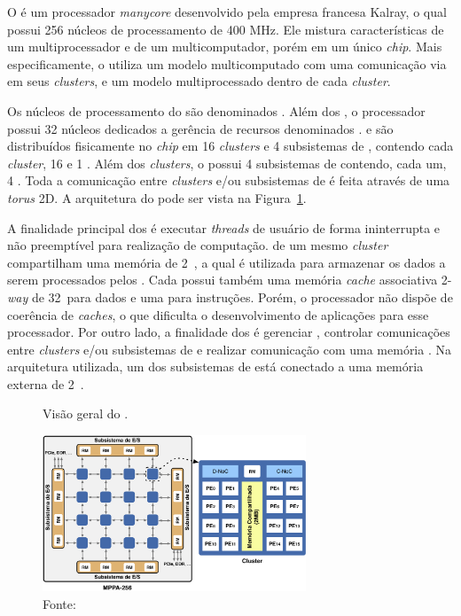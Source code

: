 O \mppa é um processador \textit{manycore} desenvolvido pela empresa francesa
Kalray, o qual possui 256 núcleos de processamento de 400 MHz. Ele mistura características
de um multiprocessador e de um multicomputador, porém em um único \textit{chip}.
Mais especificamente, o \mppa utiliza um modelo multicomputado com uma
comunicação via \noc em seus \textit{clusters}, e um modelo multiprocessado
dentro de cada \textit{cluster}.

Os núcleos de processamento do \mppa são denominados \pes.
Além dos \pes, o processador possui 32 núcleos dedicados a gerência de recursos
denominados  \rmans. \pes e \rmans são distribuídos
fisicamente no \textit{chip} em 16 \textit{clusters} e 4 subsistemas de \es,
contendo cada \textit{cluster}, 16 \pes e 1 \rman. Além dos \textit{clusters}, o
\mppa possui 4 subsistemas de \es contendo, cada um, 4 \rmans. Toda a comunicação
entre \textit{clusters} e/ou subsistemas de \es é feita através de uma \noc
\textit{torus} 2D. A arquitetura do \mppa pode ser vista na Figura~\ref{fig:mppa}.

A finalidade principal dos \pes é executar \textit{threads} de usuário de forma
ininterrupta e não preemptível para realização de computação. \pes de um mesmo
\textit{cluster} compartilham uma memória de 2~\mb, a qual é utilizada para
armazenar os dados a serem processados pelos \pes. Cada \pe possui também uma
memória \textit{cache} associativa 2-\textit{way} de 32~\kb para dados e uma para
instruções. Porém, o processador não dispõe de coerência de \textit{caches}, o
que dificulta o desenvolvimento de aplicações para esse processador. Por outro
lado, a finalidade dos \rmans é gerenciar \es, controlar comunicações entre
\textit{clusters} e/ou subsistemas de \es e realizar comunicação com uma memória
\ram. Na arquitetura utilizada, um dos subsistemas de \es está conectado a uma
memória externa \lpddr de 2~\gb.

\begin{figure}
	\centering
	\caption{Visão geral do \mppa.}
	\includegraphics[width=0.7\textwidth]{figs/mppa-overall.pdf}
    \caption*{Fonte: ~\cite{Castro-IA3:2013}}
	\label{fig:mppa}
\end{figure}

